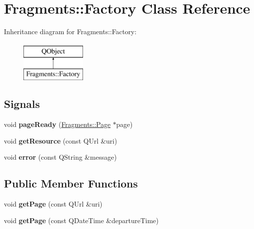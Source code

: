 \hypertarget{classFragments_1_1Factory}{}\section{Fragments\+:\+:Factory Class Reference}
\label{classFragments_1_1Factory}
Inheritance diagram for Fragments\+:\+:Factory\+:\begin{figure}[H]
\begin{center}
\leavevmode
\includegraphics[height=2.000000cm]{classFragments_1_1Factory}
\end{center}
\end{figure}
\subsection*{Signals}
\begin{DoxyCompactItemize}
\item 
\mbox{\label{classFragments_1_1Factory_a9559b78a9960c0d4981bf752b47d710a}} 
void {\bfseries page\+Ready} (\mbox{\hyperlink{classFragments_1_1Page}{Fragments\+::\+Page}} $\ast$page)
\item 
\mbox{\label{classFragments_1_1Factory_ac65f072a6cc48bb340e89a61c30688d6}} 
void {\bfseries get\+Resource} (const Q\+Url \&uri)
\item 
\mbox{\label{classFragments_1_1Factory_ab8bdc67290ccbc5444d551fbebc68b17}} 
void {\bfseries error} (const Q\+String \&message)
\end{DoxyCompactItemize}
\subsection*{Public Member Functions}
\begin{DoxyCompactItemize}
\item 
\mbox{\label{classFragments_1_1Factory_a37e59ac23a1a4889a5ef9348f1dfd0bc}} 
void {\bfseries get\+Page} (const Q\+Url \&uri)
\item 
\mbox{\label{classFragments_1_1Factory_a3c9b46f2158e91190305b25616a4bc34}} 
void {\bfseries get\+Page} (const Q\+Date\+Time \&departure\+Time)
\end{DoxyCompactItemize}
